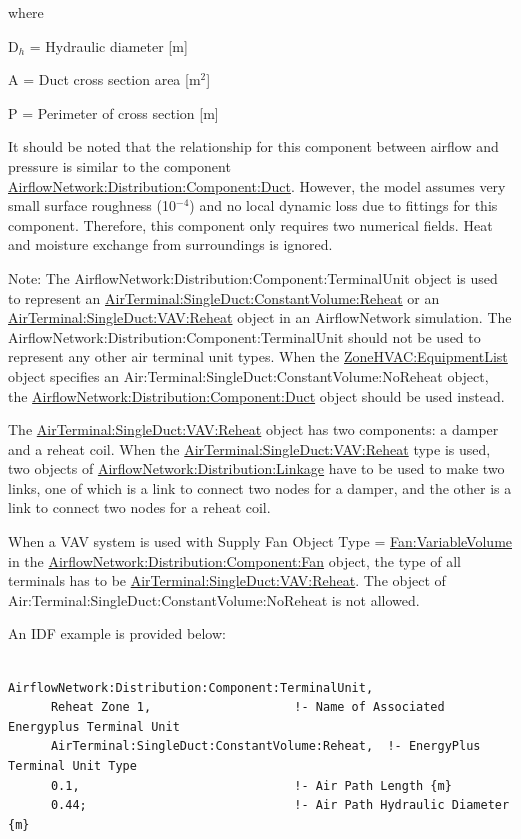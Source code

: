 where

D\(_{h}\) = Hydraulic diameter {[}m{]}

A = Duct cross section area {[}m\(^{2}\){]}

P = Perimeter of cross section {[}m{]}

It should be noted that the relationship for this component between airflow and pressure is similar to the component \hyperref[airflownetworkdistributioncomponentduct]{AirflowNetwork:Distribution:Component:Duct}. However, the model assumes very small surface roughness (10\(^{-4}\)) and no local dynamic loss due to fittings for this component. Therefore, this component only requires two numerical fields. Heat and moisture exchange from surroundings is ignored.

Note: The AirflowNetwork:Distribution:Component:TerminalUnit object is used to represent an \hyperref[airterminalsingleductconstantvolumereheat]{AirTerminal:SingleDuct:ConstantVolume:Reheat} or an \hyperref[airterminalsingleductvavreheat]{AirTerminal:SingleDuct:VAV:Reheat} object in an AirflowNetwork simulation. The AirflowNetwork:Distribution:Component:TerminalUnit should not be used to represent any other air terminal unit types. When the \hyperref[zonehvacequipmentlist]{ZoneHVAC:EquipmentList} object specifies an Air:Terminal:SingleDuct:ConstantVolume:NoReheat object, the \hyperref[airflownetworkdistributioncomponentduct]{AirflowNetwork:Distribution:Component:Duct} object should be used instead.

The \hyperref[airterminalsingleductvavreheat]{AirTerminal:SingleDuct:VAV:Reheat} object has two components: a damper and a reheat coil. When the \hyperref[airterminalsingleductvavreheat]{AirTerminal:SingleDuct:VAV:Reheat} type is used, two objects of \hyperref[airflownetworkdistributionlinkage]{AirflowNetwork:Distribution:Linkage} have to be used to make two links, one of which is a link to connect two nodes for a damper, and the other is a link to connect two nodes for a reheat coil.

When a VAV system is used with Supply Fan Object Type = \hyperref[fanvariablevolume]{Fan:VariableVolume} in the \hyperref[airflownetworkdistributioncomponentfan]{AirflowNetwork:Distribution:Component:Fan} object, the type of all terminals has to be \hyperref[airterminalsingleductvavreheat]{AirTerminal:SingleDuct:VAV:Reheat}. The object of Air:Terminal:SingleDuct:ConstantVolume:NoReheat is not allowed.

An IDF example is provided below:

\begin{lstlisting}

AirflowNetwork:Distribution:Component:TerminalUnit,
      Reheat Zone 1,                    !- Name of Associated Energyplus Terminal Unit
      AirTerminal:SingleDuct:ConstantVolume:Reheat,  !- EnergyPlus Terminal Unit Type
      0.1,                              !- Air Path Length {m}
      0.44;                             !- Air Path Hydraulic Diameter {m}
\end{lstlisting}

